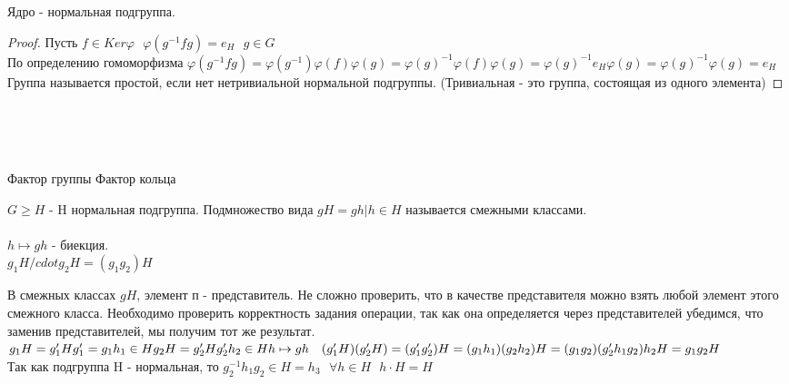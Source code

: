\begin{defin}[Свойство 2]
	Ядро - нормальная подгруппа.
\end{defin}

\begin{proof}
	Пусть $f \in Ker\varphi ~~~ \varphi(g^{-1} fg) = e_H ~~~ g\in G$\\
	По определению гомоморфизма
	$\varphi(g^{-1} fg) = \varphi(g^{-1}) \varphi(f) \varphi(g) = \varphi(g)^{-1}
	\varphi(f) \varphi(g) = \varphi(g)^{-1} e_H \varphi(g) = \varphi(g)^{-1}
	\varphi(g) = e_H$\\
	Группа называется простой, если нет нетривиальной нормальной подгруппы.
	(Тривиальная - это группа, состоящая из одного элемента)
\end{proof}

\\
\\
\\

\begin{title}
	Фактор группы Фактор кольца
\end{title}

$G \ge H$ - H нормальная подгруппа. Подмножество вида $gH = {gh | h \in H}$
называется смежными классами.\\
\\
$h \mapsto gh$ - биекция.\\
$g_1H /cdot g_2H = (g_1 g_2)H$\\

\begin{defin}
	В смежных классах $gH$, элемент п - представитель. Не сложно проверить, что в
	качестве представителя можно взять любой элемент этого смежного класса.
	Необходимо проверить корректность задания операции, так как она определяется
	через представителей убедимся, что заменив представителей, мы получим тот же
	результат.\\
	$g_1H = g'_1H\\
	g'_1 = g_1 h_1 \in H\\
	g_2H = g'_2H\\
	g'_2 h_2 \in H\\
	h \mapsto gh ~~~ (g'_1 H)(g'_2 H) = (g'_1 g'_2)H = (g_1 h_1)(g_2 h_2)H =
	(g_1 g_2)(g'_2 h_1 g_2)h_2 H = g_1 g_2 H$\\
	Так как подгруппа H - нормальная, то $g^{-1}_2 h_1 g_2 \in H = h_3 ~~~
	\forall h \in H ~~~ h \cdot H = H$\\
\end{defin}

